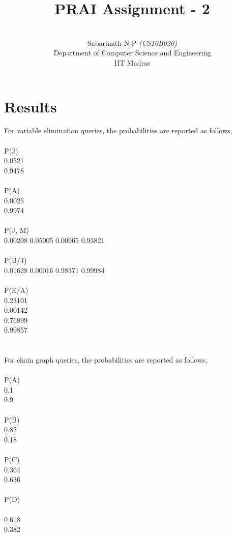 \documentclass[a4paper,10pt]{report}
\title{\huge{\textbf{PRAI Assignment - 2}}}
\author{\\[0.5cm] Sabarinath N P \emph{(CS10B020)}
	\\[0.5cm] Department of Computer Science and Engineering \\[0.2cm]
	IIT Madras\\[1.0cm]
}
\begin{document}
\renewcommand{\thesection}{1.\arabic{section}}

\maketitle
\setcounter{tocdepth}{2}

\section{Results}
For variable elimination queries, the probabilities are reported as follows,
\\\\
P(J)\\
0.0521 
\\
0.9478
\\\\
P(A)\\
0.0025 
\\
0.9974
\\\\
P(J, M)\\
0.00208
0.05005
0.00965
0.93821
\\\\
P(B/J) \\
0.01628 
0.00016
0.98371
0.99984
\\\\
P(E/A)\\
0.23101 \\
0.00142 \\
0.76899\\
0.99857\\\\\\
For chain graph queries, the probabilities are reported as follows,
\\\\
P(A)\\
0.1\\
0.9\\\\
P(B)\\
0.82\\
0.18\\\\
P(C)\\
0.364 \\
0.636\\\\
P(D)\\\\
0.618 \\
0.382\\\\
\end{document}
